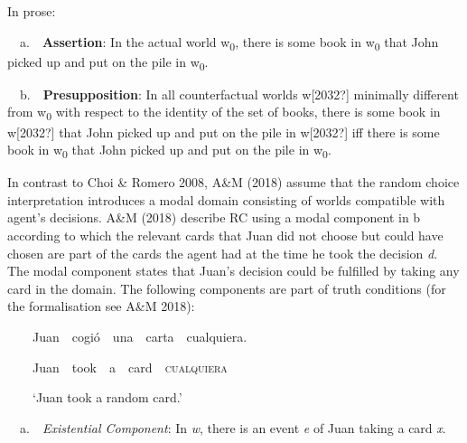 \begin{styleStandard}
In prose:
\end{styleStandard}

\begin{styleStandard}
\ \ a.\ \ \textbf{Assertion}: In the actual world w\textsubscript{0}, there is some book in w\textsubscript{0} that John picked up and put on the pile in w\textsubscript{0}.
\end{styleStandard}

\begin{styleStandard}
\ \ b.\ \ \textbf{Presupposition}: In all counterfactual worlds w[2032?] minimally different from w\textsubscript{0} with respect to the identity of the set of books, there is some book in w[2032?] that John picked up and put on the pile in w[2032?] iff there is some book in w\textsubscript{0} that John picked up and put on the pile in w\textsubscript{0}.
\end{styleStandard}

\begin{styleStandard}
In contrast to Choi \& Romero 2008, A\&M (2018) assume that the random choice interpretation introduces a modal domain consisting of worlds compatible with agent’s decisions. A\&M (2018) describe RC using a modal component in b according to which the relevant cards that Juan did not choose but could have chosen are part of the cards the agent had at the time he took the decision \textit{d}. The modal component states that Juan’s decision could be fulfilled by taking any card in the domain. The following components are part of truth conditions (for the formalisation see A\&M 2018):
\end{styleStandard}

\begin{styleStandard}
\ \ \ \ Juan\ \ cogió\ \ una\ \ carta\ \ cualquiera.
\end{styleStandard}

\begin{styleStandard}
\ \ \ \ Juan\ \ took\ \ a\ \ card\textit{\ \ }\textsc{cualquiera}
\end{styleStandard}

\begin{styleStandard}
\ \ \ \ ‘Juan took a random card.’
\end{styleStandard}

\begin{styleStandard}
\label{bkm:Ref150779122}\ \ a.\ \ \textit{Existential Component}: In \textit{w}, there is an event \textit{e} of Juan taking a card \textit{x}.
\end{styleStandard}

